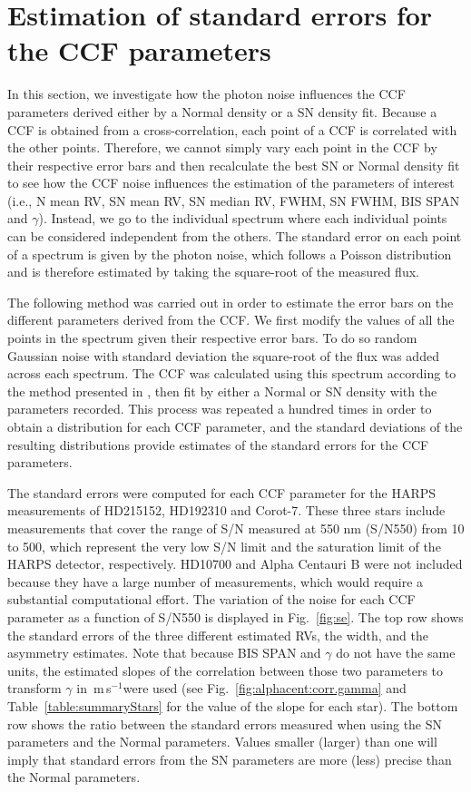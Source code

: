 \documentclass{aa}
\def\ms{\hbox{\,m\,s$^{-1}$}}         %
\begin{document}
\section{Estimation of standard errors for the CCF parameters} \label{sec:5}

In this section, we investigate how the photon noise influences the CCF parameters derived either by a Normal density or a SN density fit. 
Because a CCF is obtained from a cross-correlation, each point of a CCF is correlated with the other points. Therefore, we cannot simply vary each point in the CCF by their respective error bars and then recalculate the best SN or Normal density fit to see how the CCF noise influences the estimation of the parameters of interest (i.e., N mean RV, SN mean RV, SN median RV, FWHM, SN FWHM, BIS SPAN and $\gamma$). 
Instead, we go to the individual spectrum where each individual points can be considered independent from the others.
The standard error on each point of a spectrum is given by the photon noise, which follows a Poisson distribution and is therefore estimated by taking the square-root of the measured flux.

The following method was carried out in order to estimate the error bars on the different parameters derived from the CCF. 
We first modify the values of all the points in the spectrum given their respective error bars. 
To do so random Gaussian noise with standard deviation the square-root of the flux was added across each spectrum. 
The CCF was calculated using this spectrum according to the method presented in \citet{Pepe-2002a}, then fit by either a Normal or SN density with the parameters recorded. 
This process was repeated a hundred times in order to obtain a distribution for each CCF parameter, and the standard deviations of the resulting distributions provide estimates of the standard errors for the CCF parameters.

The standard errors were computed for each CCF parameter for the HARPS measurements of HD215152, HD192310 and Corot-7. 
These three stars include measurements that cover the range of S/N measured at 550 nm (S/N550) from 10 to 500, which represent the very low S/N limit and the saturation limit of the HARPS detector, respectively. 
HD10700 and Alpha Centauri B were not included because they have a large number of measurements, which would require a substantial computational effort.
The variation of the noise for each CCF parameter as a function of S/N550 is displayed in Fig.~\ref{fig:se}.
The top row shows the standard errors of the three different estimated RVs, the width, and the asymmetry estimates. 
Note that because BIS SPAN and $\gamma$ do not have the same units, the estimated slopes of the correlation between those two parameters to transform $\gamma$ in \ms were used (see Fig.~\ref{fig:alphacent:corr.gamma} and Table~\ref{table:summaryStars} for the value of the slope for each star). 
The bottom row shows the ratio between the standard errors measured when using the SN parameters and the Normal parameters. Values smaller (larger) than one will imply that standard errors from the SN parameters are more (less) precise than the Normal parameters.
\end{document}
